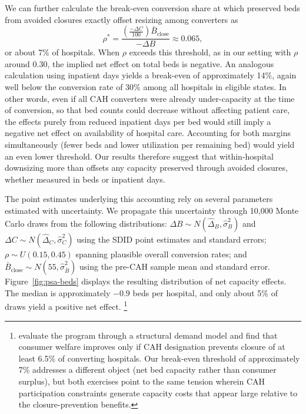 \documentclass[a4paper, 12pt, twoside]{article}
\begin{document}
We can further calculate the break-even conversion share at which preserved beds from avoided closures exactly offset resizing among converters as
\begin{equation}
\rho^{*}
=
\frac{\left(\frac{-\Delta C}{100}\right)\bar B_{\text{close}}}{-\Delta B}
\approx 0.065,
\label{eq:rho_star_beds}
\end{equation}
or about 7\% of hospitals. When $\rho$ exceeds this threshold, as in our setting with $\rho$ around 0.30, the implied net effect on total beds is negative. An analogous calculation using inpatient days yields a break-even of approximately 14\%, again well below the conversion rate of 30\% among all hospitals in eligible states. In other words, even if all CAH converters were already under-capacity at the time of conversion, so that bed counts could decrease without affecting patient care, the effects purely from reduced inpatient days per bed would still imply a negative net effect on availability of hospital care. Accounting for both margins simultaneously (fewer beds and lower utilization per remaining bed) would yield an even lower threshold. Our results therefore suggest that within-hospital downsizing more than offsets any capacity preserved through avoided closures, whether measured in beds or inpatient days.

The point estimates underlying this accounting rely on several parameters estimated with uncertainty. We propagate this uncertainty through 10,000 Monte Carlo draws from the following distributions: $\Delta B \sim N(\hat\Delta_B, \hat\sigma_B^2)$ and $\Delta C \sim N(\hat\Delta_C, \hat\sigma_C^2)$ using the SDID point estimates and standard errors; $\rho \sim U(0.15, 0.45)$ spanning plausible overall conversion rates; and $\bar B_{\text{close}} \sim N(55, \hat\sigma^2_{\bar B})$ using the pre-CAH sample mean and standard error. Figure~\ref{fig:psa-beds} displays the resulting distribution of net capacity effects. The median is approximately $-0.9$ beds per hospital, and only about 5\% of draws yield a positive net effect. \footnote{\cite{gowrisankaran2018} evaluate the program through a structural demand model and find that consumer welfare improves only if CAH designation prevents closure of at least 6.5\% of converting hospitals. Our break-even threshold of approximately 7\% addresses a different object (net bed capacity rather than consumer surplus), but both exercises point to the same tension wherein CAH participation constraints generate capacity costs that appear large relative to the closure-prevention benefits.}
\end{document}
